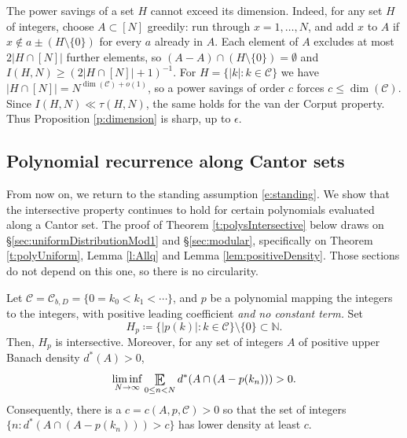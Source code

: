 \begin{remark}
The power savings of a set $H$ cannot exceed its dimension. 
Indeed, for any set $H$ of integers, choose $A\subset[N]$ greedily: run through $x=1,\ldots,N$, and add $x$ to $A$ if $x\notin a\pm (H\setminus\{0\})$ for every $a$ already in $A$. 
Each element of $A$ excludes at most $2\lvert H\cap[N]\rvert$ further elements, so $(A-A)\cap (H\setminus\{0\})=\emptyset$ and 
$I(H,N)\geq (2\lvert H\cap[N]\rvert+1)^{-1}$. 
For $H=\{\lvert k\rvert\colon k\in\mathcal C\}$ we have $\lvert H\cap[N]\rvert=N^{\dim(\mathcal C)+o(1)}$, so a power savings of order $c$ forces $c\leq\dim(\mathcal C)$. 
Since $I(H,N)\ll \tau(H,N)$, the same holds for the van der Corput property. 
Thus Proposition \ref{p:dimension} is sharp, up to $\epsilon$. 
\end{remark}




\subsection{Polynomial recurrence along Cantor sets}
From now on, we return to the standing assumption \eqref{e:standing}. 
We show that the intersective property continues to hold for certain polynomials evaluated along a Cantor set.  
The proof of Theorem \ref{t:polysIntersective} below draws on \S\ref{sec:uniformDistributionMod1} and \S\ref{sec:modular}, 
specifically on Theorem \ref{t:polyUniform}, Lemma \ref{l:Allq} and Lemma \ref{lem:positiveDensity}. 
Those sections do not depend on this one, so there is no circularity.  



\begin{theorem} \label{t:polysIntersective}
 Let $\mathcal C = \mathcal C_{b,D} = \{0=k_0<k_1< \cdots \}$, and $p $ be  a  polynomial 
 mapping the integers to the integers, with  positive leading coefficient 
 \emph{and no constant term.}
Set 
\begin{equation} \label{e:Hp}
H_p \coloneqq \{ \lvert p(k)\rvert \colon k \in \mathcal C\}\setminus \{0\} \subset \mathbb{N}. 
\end{equation}
Then, $H_p $ is intersective.  
Moreover, for any set of integers $A$ of positive upper Banach density $d^\ast(A)>0$, 
\begin{equation} \label{e;CantorDensity}
    \liminf_{N\to\infty} \Expectation_{0\leq n<N}
     d^\ast (A\cap (A - p(k_n)))  >0. 
\end{equation}
Consequently, there is a $c = c(A,p,\mathcal C)>0$ so that  the set of integers $\{n \colon d^\ast(A\cap (A-p(k_n))) >c \}$ 
has lower density at least $c$. 
\end{theorem}


